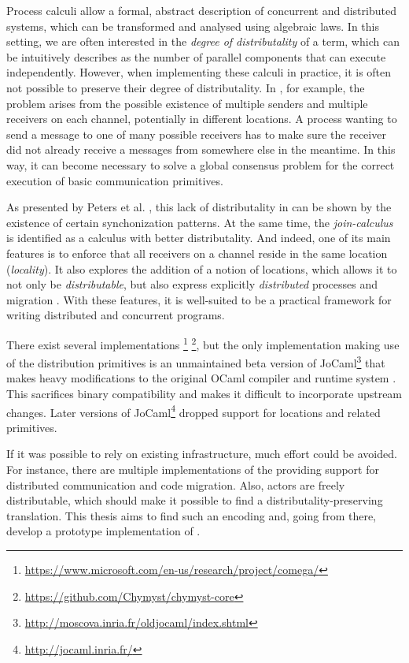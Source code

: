 Process calculi allow a formal, abstract description of concurrent
and distributed systems, which can be transformed and analysed
using algebraic laws.
In this setting, we are often interested in the
\emph{degree of distributality} of a term,
which can be intuitively describes as the number of parallel components
that can execute independently.
However, when implementing these calculi in practice,
it is often not possible to preserve their degree of distributality.
In \picalc, for example,
the problem arises from the possible existence of multiple senders
and multiple receivers on each channel, potentially in different locations.
A process wanting to send a message to one of many possible receivers
has to make sure the receiver did not already receive a messages
from somewhere else in the meantime.
In this way, it can become necessary to solve a global consensus problem
for the correct execution of basic communication primitives.

As presented by Peters et al. \cite{peters_distributability_2013},
this lack of distributality in \asyncpicalc can be shown by the existence of
certain synchonization patterns.
At the same time, the \emph{join-calculus} \cite{fournet_reflexive_1996}
is identified as a calculus with better distributality.
And indeed, one of its main features is to enforce that all receivers on a channel
reside in the same location (\emph{locality}).
It also explores the addition of a notion of locations,
which allows it to not only be \emph{distributable},
but also express explicitly \emph{distributed} processes
and migration \cite{fournet_calculus_1996}.
With these features, it is well-suited to be a practical framework for
writing distributed and concurrent programs.

There exist several implementations
\footnote{\url{https://www.microsoft.com/en-us/research/project/comega/}}
\footnote{\url{https://github.com/Chymyst/chymyst-core}},
but the only implementation making use of the distribution primitives
is an unmaintained beta version of
JoCaml\footnote{\url{http://moscova.inria.fr/oldjocaml/index.shtml}}
that makes heavy modifications to the original OCaml compiler and runtime system
\cite{conchon_jocaml:_1999}.
This sacrifices binary compatibility and makes it difficult to incorporate
upstream changes.
Later versions of JoCaml\footnote{\url{http://jocaml.inria.fr/}}
dropped support for locations and related primitives.

If it was possible to rely on existing infrastructure,
much effort could be avoided.
For instance, there are multiple implementations of the \actormodel
providing support for distributed communication and code migration.
Also, actors are freely distributable, which should make it possible
to find a distributality-preserving translation.
This thesis aims to find such an encoding and, going from there,
develop a prototype implementation of \distjoincalc.


